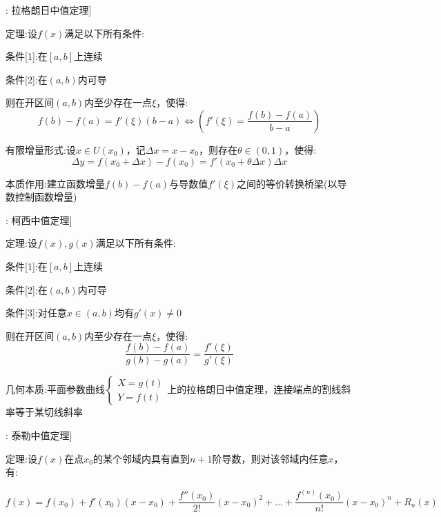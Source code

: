 \documentclass[11pt,a4paper,UTF8]{ctexart}
\begin{document}
\begin{thmbox}[定理[4]: 拉格朗日中值定理]

定理:设$f(x)$满足以下所有条件: 

  条件[1]:在$[a, b]$上连续

  条件[2]:在$(a, b)$内可导

则在开区间$(a, b)$内至少存在一点$\xi$，使得:
\begin{equation*}
f(b) - f(a) = f'(\xi)(b - a) \Leftrightarrow \left(f'(\xi) = \frac{f(b) - f(a)}{b - a}\right)
\end{equation*}


有限增量形式:设$x \in U(x_0)$，记$\Delta x = x - x_0$，则存在$\theta \in(0, 1)$，使得:
\begin{equation*}
\Delta y = f(x_0 + \Delta x) - f(x_0) = f'(x_0 + \theta \Delta x)\Delta x
\end{equation*}


  本质作用:建立函数增量$f(b) - f(a)$与导数值$f'(\xi)$之间的等价转换桥梁(以导数控制函数增量) 

\end{thmbox}
\begin{thmbox}[定理[5]: 柯西中值定理]

定理:设$f(x), g(x)$满足以下所有条件:

条件[1]:在$[a, b]$上连续

条件[2]:在$(a, b)$内可导

条件[3]:对任意$x \in(a, b)$均有$g'(x) \neq 0$ 

则在开区间$(a, b)$内至少存在一点$\xi$，使得:
\begin{equation*}
\frac{f(b) - f(a)}{g(b) - g(a)} = \frac{f'(\xi)}{g'(\xi)}
\end{equation*}


  几何本质:平面参数曲线$\begin{cases} X = g(t) \\ Y = f(t) \end{cases}$上的拉格朗日中值定理，连接端点的割线斜率等于某切线斜率 

\end{thmbox}
\begin{thmbox}[定理[6]: 泰勒中值定理]

定理:设$f(x)$在点$x_0$的某个邻域内具有直到$n+1$阶导数，则对该邻域内任意$x$，有:

\end{thmbox}

\begin{equation*}
f(x) = f(x_0) + f'(x_0)(x - x_0) + \frac{f''(x_0)}{2!}(x - x_0)^2 + \dots + \frac{f^{(n)}(x_0)}{n!}(x - x_0)^n + R_n(x)
\end{equation*}
\end{document}
